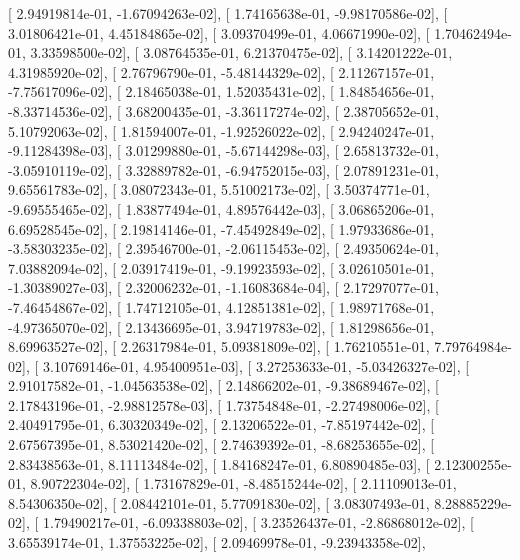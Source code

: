 \documentclass{article}
\begin{document}
       [  2.94919814e-01,  -1.67094263e-02],
       [  1.74165638e-01,  -9.98170586e-02],
       [  3.01806421e-01,   4.45184865e-02],
       [  3.09370499e-01,   4.06671990e-02],
       [  1.70462494e-01,   3.33598500e-02],
       [  3.08764535e-01,   6.21370475e-02],
       [  3.14201222e-01,   4.31985920e-02],
       [  2.76796790e-01,  -5.48144329e-02],
       [  2.11267157e-01,  -7.75617096e-02],
       [  2.18465038e-01,   1.52035431e-02],
       [  1.84854656e-01,  -8.33714536e-02],
       [  3.68200435e-01,  -3.36117274e-02],
       [  2.38705652e-01,   5.10792063e-02],
       [  1.81594007e-01,  -1.92526022e-02],
       [  2.94240247e-01,  -9.11284398e-03],
       [  3.01299880e-01,  -5.67144298e-03],
       [  2.65813732e-01,  -3.05910119e-02],
       [  3.32889782e-01,  -6.94752015e-03],
       [  2.07891231e-01,   9.65561783e-02],
       [  3.08072343e-01,   5.51002173e-02],
       [  3.50374771e-01,  -9.69555465e-02],
       [  1.83877494e-01,   4.89576442e-03],
       [  3.06865206e-01,   6.69528545e-02],
       [  2.19814146e-01,  -7.45492849e-02],
       [  1.97933686e-01,  -3.58303235e-02],
       [  2.39546700e-01,  -2.06115453e-02],
       [  2.49350624e-01,   7.03882094e-02],
       [  2.03917419e-01,  -9.19923593e-02],
       [  3.02610501e-01,  -1.30389027e-03],
       [  2.32006232e-01,  -1.16083684e-04],
       [  2.17297077e-01,  -7.46454867e-02],
       [  1.74712105e-01,   4.12851381e-02],
       [  1.98971768e-01,  -4.97365070e-02],
       [  2.13436695e-01,   3.94719783e-02],
       [  1.81298656e-01,   8.69963527e-02],
       [  2.26317984e-01,   5.09381809e-02],
       [  1.76210551e-01,   7.79764984e-02],
       [  3.10769146e-01,   4.95400951e-03],
       [  3.27253633e-01,  -5.03426327e-02],
       [  2.91017582e-01,  -1.04563538e-02],
       [  2.14866202e-01,  -9.38689467e-02],
       [  2.17843196e-01,  -2.98812578e-03],
       [  1.73754848e-01,  -2.27498006e-02],
       [  2.40491795e-01,   6.30320349e-02],
       [  2.13206522e-01,  -7.85197442e-02],
       [  2.67567395e-01,   8.53021420e-02],
       [  2.74639392e-01,  -8.68253655e-02],
       [  2.83438563e-01,   8.11113484e-02],
       [  1.84168247e-01,   6.80890485e-03],
       [  2.12300255e-01,   8.90722304e-02],
       [  1.73167829e-01,  -8.48515244e-02],
       [  2.11109013e-01,   8.54306350e-02],
       [  2.08442101e-01,   5.77091830e-02],
       [  3.08307493e-01,   8.28885229e-02],
       [  1.79490217e-01,  -6.09338803e-02],
       [  3.23526437e-01,  -2.86868012e-02],
       [  3.65539174e-01,   1.37553225e-02],
       [  2.09469978e-01,  -9.23943358e-02],
\end{document}

